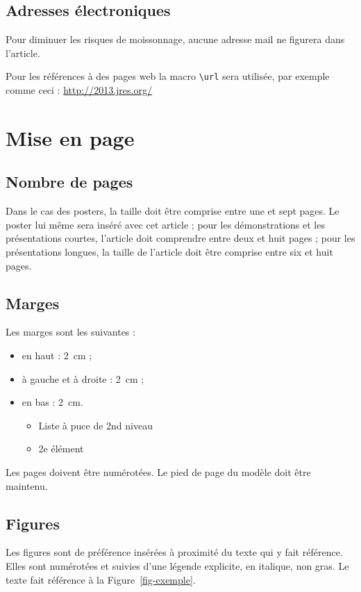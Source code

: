 \documentclass[city=Montpellier,year=2013]{jres}
\begin{document}
\subsection{Adresses électroniques}

Pour diminuer les risques de moissonnage, aucune adresse mail ne
figurera dans l'article. 

Pour les références à des pages web la macro
\verb|\url| sera utilisée, par exemple comme ceci : \url{http://2013.jres.org/}

\section{Mise en page}

\subsection{Nombre de pages}

Dans le cas des posters, la taille doit être comprise entre une et
sept pages. Le poster lui même sera inséré avec cet article ; pour les
démonstrations et les présentations courtes, l'article doit comprendre
entre deux et huit pages ; pour les présentations longues, la taille
de l'article doit être comprise entre six et huit pages.

\subsection{Marges}

Les marges sont les suivantes :

\begin{itemize}
\item en haut : 2\ cm ;
\item à gauche et à droite : 2\ cm ;
\item en bas : 2\ cm.
\begin{itemize}
\item Liste à puce de 2nd niveau
\item 2e élément
\end{itemize}
\end{itemize}

Les pages doivent être numérotées. Le pied de page du modèle doit être
maintenu.

\subsection{Figures}

Les figures sont de préférence insérées à proximité du texte qui y
fait référence. Elles sont numérotées et suivies d'une légende
explicite, en italique, non gras. Le texte fait référence à la
Figure~\ref{fig-exemple}.
\end{document}
